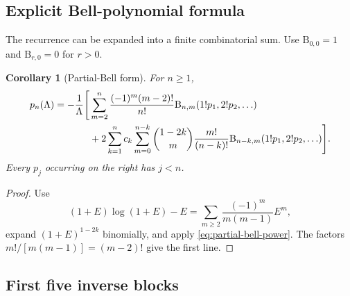 \documentclass[11pt,oneside]{article}
\theoremstyle{plain}
\newtheorem{corollary}[theorem]{Corollary}
\theoremstyle{definition}
\theoremstyle{remark}
\newcommand{\BellP}{\mathrm B}
\begin{document}
\subsection{Explicit Bell-polynomial formula}

The recurrence can be expanded into a finite combinatorial sum.  Use
\(\BellP_{0,0}=1\) and \(\BellP_{r,0}=0\) for \(r>0\).

\begin{corollary}[Partial-Bell form]
\label{cor:pn-bell}
For \(n\ge1\),
\begin{align}
 p_n(\Lambda)=-\frac1\Lambda\Bigg[{}
 &\sum_{m=2}^{n}\frac{(-1)^m(m-2)!}{n!}
 \BellP_{n,m}(1!p_1,2!p_2,\ldots)
 \notag\\
 &+2\sum_{k=1}^{n}c_k
   \sum_{m=0}^{n-k}
   \binom{1-2k}{m}\frac{m!}{(n-k)!}
   \BellP_{n-k,m}(1!p_1,2!p_2,\ldots)
 \Bigg].
 \label{eq:pn-bell}
\end{align}
Every \(p_j\) occurring on the right has \(j<n\).
\end{corollary}

\begin{proof}
Use
\begin{equation}
 (1+E)\log(1+E)-E
 =\sum_{m\ge2}\frac{(-1)^m}{m(m-1)}E^m,
 \label{eq:kernel-series}
\end{equation}
expand \((1+E)^{1-2k}\) binomially, and apply
\cref{eq:partial-bell-power}.  The factors
\(m!/[m(m-1)]=(m-2)!\) give the first line.
\end{proof}

\subsection{First five inverse blocks}
\label{sec:first-blocks}
\end{document}

